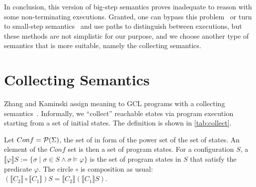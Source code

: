In conclusion, this version of big-step semantics proves inadequate to reason with some non-terminating executions. 
Granted, one can bypass this problem~\cite{leroy2009CoinductiveBigstepOperational, nakata2009TraceBasedCoinductiveOperational} or turn to small-step semantics~\cite{nakata2009TraceBasedCoinductiveOperational} and use paths to distinguish between executions, but these methods are not simplistic for our purpose, and we choose another type of semantics that is more suitable, namely the collecting semantics. 


\newcommand{\sem}[1]{\llbracket #1 \rrbracket}
\newcommand{\power}[1]{\mathcal{P}(#1)}

\section{Collecting Semantics}\label{sec:collecting}
Zhang and Kaminski assign meaning to GCL programs with a collecting semantics~\cite{zhang22-full}. 
Informally, we ``collect'' reachable states via program execution starting from a set of initial states. 
The definition is shown in \autoref{tab:collect}. 

Let $Conf = \power{\S}$, the set of  in form of the power set of the set of states. 
An element of the $Conf$ set is then a set of program states. 
For a configuration $S$, a  $\sem{\varphi}S:=\{\sigma\mid\sigma\in S \wedge \sigma\vDash\varphi\}$ is the set of program states in $S$ that satisfy the predicate $\varphi$. 
The circle $\circ$ is composition as usual: $(\sem{C_2}\circ\sem{C_1})S = \sem{C_2}(\sem{C_1}S)$. 


